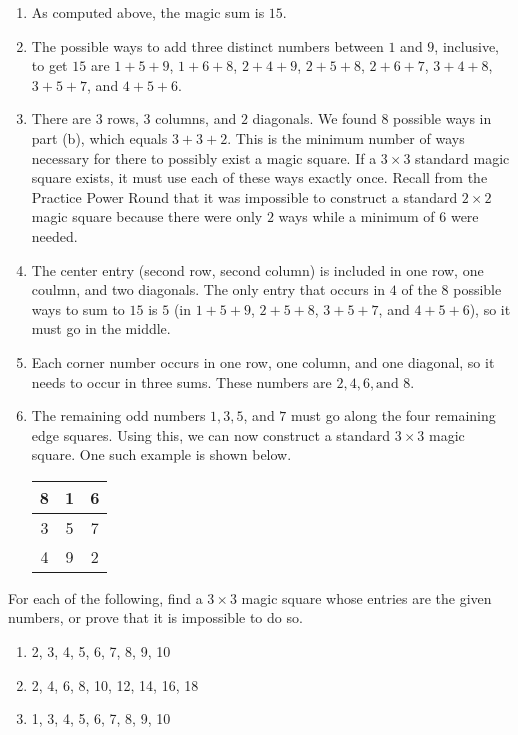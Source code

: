 \documentclass[11pt]{article}
\renewenvironment{problem}{\begin{problems}}{\end{problems}\vspace{5pt}}
\begin{document}
\begin{solution}
\begin{enumerate}[label=(\alph*)]
\item As computed above, the magic sum is $\boxed{15}$.

\item The possible ways to add three distinct numbers between $1$ and $9$, inclusive, to get $15$ are $1+5+9$, 
$1+6+8$, $2+4+9$, $2+5+8$, $2+6+7$, $3+4+8$, $3+5+7$, and $4+5+6$.

\item There are $3$ rows, $3$ columns, and $2$ diagonals. We found $\boxed{8}$ possible ways in part (b), which
equals $3+3+2$. This is the minimum number of ways necessary for there to possibly exist a magic square.
If a $3 \times 3$ standard magic square exists, it must use each of these ways exactly once.
Recall from the Practice Power Round that it was impossible to construct a standard $2 \times 2$ magic square
because there were only $2$ ways while a minimum of $6$ were needed.

\item The center entry (second row, second column) is included in one row, one coulmn, and two diagonals.
The only entry that occurs in $4$ of the $8$ possible ways to sum to $15$ is $\boxed{5}$ (in $1+5+9$, $2+5+8$,
$3+5+7$, and $4+5+6$), so it must go in the middle.

\item Each corner number occurs in one row, one column, and one diagonal, so it needs to occur in three sums.
These numbers are $\boxed{2, 4, 6, \text{and } 8}$.

\item The remaining odd numbers $1, 3, 5$, and $7$ must go along the four remaining edge squares.
Using this, we can now construct a standard $3 \times 3$ magic square. One such example is shown below.
\begin{center}
\begin{tabular}{|c|c|c|}
\hline
8 & 1 & 6 \\ \hline
3 & 5 & 7 \\ \hline
4 & 9 & 2 \\ \hline
\end{tabular}
\end{center}
\end{enumerate}
\end{solution}


\begin{problem}[12=4+4+4 points]
For each of the following, find a $3 \times 3$ magic square whose entries are the given numbers, or prove that it is impossible to do so.
\begin{enumerate}[label=(\alph*)]
\item 2, 3, 4, 5, 6, 7, 8, 9, 10

\item 2, 4, 6, 8, 10, 12, 14, 16, 18

\item 1, 3, 4, 5, 6, 7, 8, 9, 10
\end{enumerate}
\end{problem}
\end{document}

